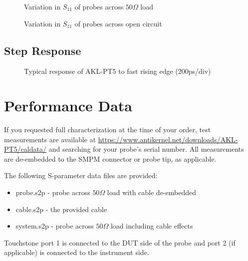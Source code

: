 \documentclass[11pt]{article}
\begin{document}
\begin{figure}[h!]
\centering
\caption{Variation in $S_{11}$ of probes across $50\Omega$ load}
\label{s11-open-variation}
\end{figure}

\begin{figure}[h!]
\centering
\caption{Variation in $S_{11}$ of probes across open circuit}
\label{s11-variation}
\end{figure}

\FloatBarrier

\pagebreak
\subsection{Step Response}

\begin{figure}[h!]
\centering
\caption{Typical response of AKL-PT5 to fast rising edge (200ps/div)}
\label{step-response}
\end{figure}

\FloatBarrier

\pagebreak
\section{Performance Data}

If you requested full characterization at the time of your order, test measurements are available at
\url{https://www.antikernel.net/downloads/AKL-PT5/caldata/} and searching for your probe's serial number. All
measurements are de-embedded to the SMPM connector or probe tip, as applicable.

The following S-parameter data files are provided:
\begin{itemize}
\item probe.s2p - probe across $50 \Omega$ load with cable de-embedded
\item cable.s2p - the provided cable
\item system.s2p - probe across $50 \Omega$ load including cable effects
\end{itemize}

Touchstone port 1 is connected to the DUT side of the probe and port 2 (if applicable) is connected to the instrument
side.

\end{document}
